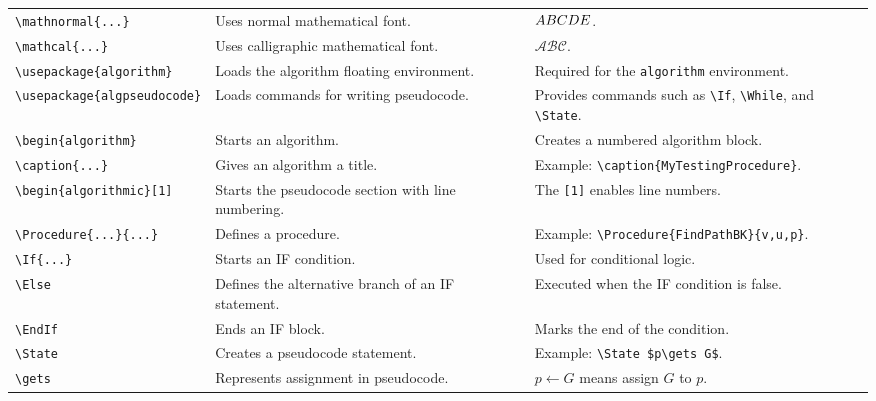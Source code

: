 \documentclass[a4paper,10pt]{article}
\begin{document}
\begin{longtable}{p{} p{} p{}}
\texttt{\textbackslash mathnormal\{...\}} &
Uses normal mathematical font. &
$\mathnormal{ABCDE}$.
\\

\texttt{\textbackslash mathcal\{...\}} &
Uses calligraphic mathematical font. &
$\mathcal{ABC}$.
\\

\texttt{\textbackslash usepackage\{algorithm\}} &
Loads the algorithm floating environment. &
Required for the \texttt{algorithm} environment.
\\

\texttt{\textbackslash usepackage\{algpseudocode\}} &
Loads commands for writing pseudocode. &
Provides commands such as \texttt{\textbackslash If},
\texttt{\textbackslash While}, and \texttt{\textbackslash State}.
\\

\texttt{\textbackslash begin\{algorithm\}} &
Starts an algorithm. &
Creates a numbered algorithm block.
\\

\texttt{\textbackslash caption\{...\}} &
Gives an algorithm a title. &
Example: \texttt{\textbackslash caption\{MyTestingProcedure\}}.
\\

\texttt{\textbackslash begin\{algorithmic\}[1]} &
Starts the pseudocode section with line numbering. &
The \texttt{[1]} enables line numbers.
\\

\texttt{\textbackslash Procedure\{...\}\{...\}} &
Defines a procedure. &
Example: \texttt{\textbackslash Procedure\{FindPathBK\}\{v,u,p\}}.
\\

\texttt{\textbackslash If\{...\}} &
Starts an IF condition. &
Used for conditional logic.
\\

\texttt{\textbackslash Else} &
Defines the alternative branch of an IF statement. &
Executed when the IF condition is false.
\\

\texttt{\textbackslash EndIf} &
Ends an IF block. &
Marks the end of the condition.
\\

\texttt{\textbackslash State} &
Creates a pseudocode statement. &
Example: \texttt{\textbackslash State \$p\textbackslash gets G\$}.
\\

\texttt{\textbackslash gets} &
Represents assignment in pseudocode. &
$p\gets G$ means assign $G$ to $p$.
\\


\end{longtable}
\end{document}
